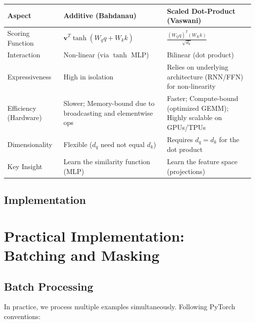 \documentclass{article}
\begin{document}
\begin{center}
\begin{tabular}{|l|p{5cm}|p{5cm}|}
\hline
\textbf{Aspect} & \textbf{Additive (Bahdanau)} & \textbf{Scaled Dot-Product (Vaswani)} \\
\hline
Scoring Function & $\bm{v}^T \tanh(W_q q + W_k k)$ & $\frac{(W_Q q)^T (W_K k)}{\sqrt{d_k}}$ \\
\hline
Interaction & Non-linear (via $\tanh$ MLP) & Bilinear (dot product) \\
\hline
Expressiveness & High in isolation & Relies on underlying architecture (RNN/FFN) for non-linearity \\
\hline
Efficiency (Hardware) & Slower; Memory-bound due to broadcasting and elementwise ops & Faster; Compute-bound (optimized GEMM); Highly scalable on GPUs/TPUs \\
\hline
Dimensionality & Flexible ($d_q$ need not equal $d_k$) & Requires $d_q = d_k$ for the dot product \\
\hline
Key Insight & Learn the similarity function (MLP) & Learn the feature space (projections) \\
\hline
\end{tabular}
\end{center}



\subsection{Implementation}


\section{Practical Implementation: Batching and Masking}

\subsection{Batch Processing}

In practice, we process multiple examples simultaneously. Following PyTorch conventions:
\end{document}
